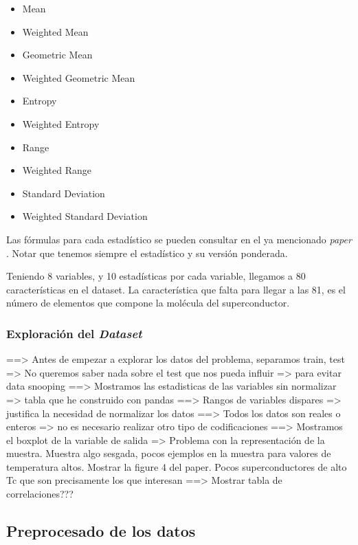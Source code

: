 \documentclass[11pt]{article}
\begin{document}
\begin{itemize}
    \item Mean
    \item Weighted Mean
    \item Geometric Mean
    \item Weighted Geometric Mean
    \item Entropy
    \item Weighted Entropy
    \item Range
    \item Weighted Range
    \item Standard Deviation
    \item Weighted Standard Deviation
\end{itemize}

Las fórmulas para cada estadístico se pueden consultar en el ya mencionado \emph{paper} \cite{original_paper_reg:paper}. Notar que tenemos siempre el estadístico y su versión ponderada.

Teniendo 8 variables, y 10 estadísticas por cada variable, llegamos a 80 características en el dataset. La característica que falta para llegar a las 81, es el número de elementos que compone la molécula del superconductor.

\subsubsection{Exploración del \emph{Dataset}}

==> Antes de empezar a explorar los datos del problema, separamos train, test => No queremos saber nada sobre el test que nos pueda influir => para evitar data snooping
==> Mostramos las estadisticas de las variables sin normalizar => tabla que he construido con pandas
==> Rangos de variables dispares => justifica la necesidad de normalizar los datos
==> Todos los datos son reales o enteros => no es necesario realizar otro tipo de codificaciones
==> Mostramos el boxplot de la variable de salida => Problema con la representación de la muestra. Muestra algo sesgada, pocos ejemplos en la muestra para valores de temperatura altos. Mostrar la figure 4 del paper. Pocos superconductores de alto Tc que son precisamente los que interesan
==> Mostrar tabla de correlaciones???

\subsection{Preprocesado de los datos}
\end{document}
